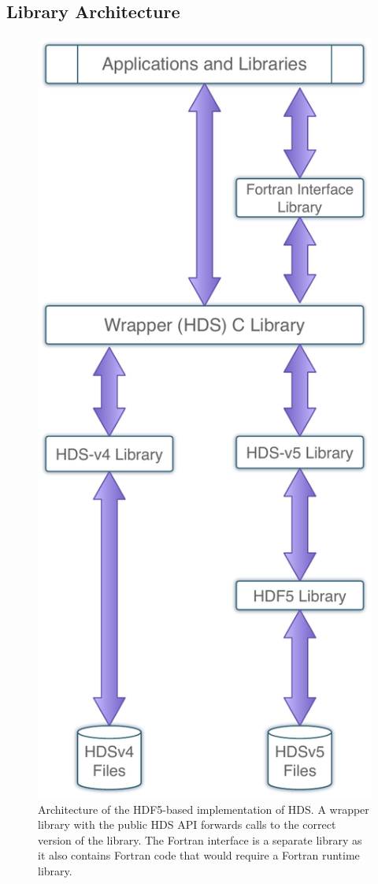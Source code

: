 \documentclass[final,authoryear,5p,times,twocolumn]{elsarticle}
\begin{document}
\subsection{Library Architecture}

\begin{figure}[t]
\begin{center}
\includegraphics[width=0.7\columnwidth]{LibraryArchitecture}
\end{center}
\caption{Architecture of the HDF5-based implementation of HDS. A
  wrapper library with the public HDS API forwards calls to the
  correct version of the library. The Fortran interface is a separate
  library as it also contains Fortran code that would require a
  Fortran runtime library.}
\label{fig:arch}
\end{figure}
\end{document}
